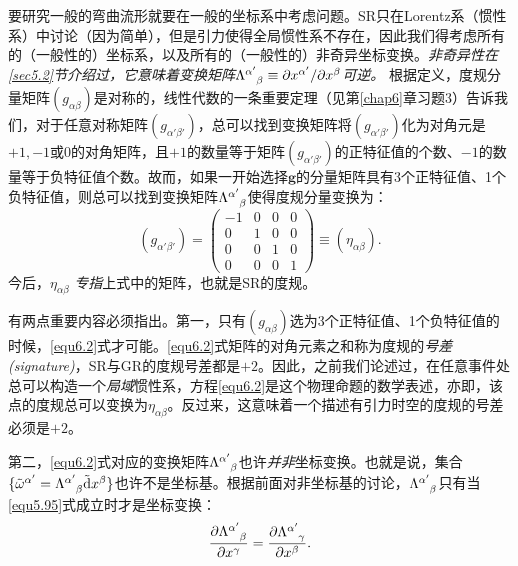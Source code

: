 要研究一般的弯曲流形就要在一般的坐标系中考虑问题。SR只在Lorentz系（惯性系）中讨论（因为简单），但是引力使得全局惯性系不存在，因此我们得考虑所有的（一般性的）坐标系，以及所有的（一般性的）非奇异坐标变换。\textit{非奇异性在\ref{sec5.2}节介绍过，它意味着变换矩阵$\Lambda\indices{^{\alpha'}_\beta} \equiv \partial x^{\alpha'} / \partial x^\beta$可逆。} 根据定义，度规分量矩阵$(g_{\alpha \beta})$是对称的，线性代数的一条重要定理（见第\ref{chap6}章习题3）告诉我们，对于任意对称矩阵$(g_{\alpha' \beta'})$，总可以找到变换矩阵将$(g_{\alpha' \beta'})$化为对角元是$+1, -1$或0的对角矩阵，且$+1$的数量等于矩阵$(g_{\alpha' \beta'})$的正特征值的个数、$-1$的数量等于负特征值个数。故而，如果一开始选择$\bm{g}$的分量矩阵具有3个正特征值、1个负特征值，则总可以找到变换矩阵$\Lambda\indices{^{\alpha'}_\beta}$使得度规分量变换为：
\begin{equation}
    (g_{\alpha' \beta'}) = 
    \begin{pmatrix}
        -1 & 0 & 0 & 0 \\
        0 & 1 & 0 & 0 \\
        0 & 0 & 1 & 0 \\
        0 & 0 & 0 & 1
    \end{pmatrix}
    \equiv (\eta_{\alpha \beta}).
\label{equ6.2}
\end{equation}
今后，$\eta_{\alpha \beta}$ \textit{专指}上式中的矩阵，也就是SR的度规。

有两点重要内容必须指出。第一，只有$(g_{\alpha \beta})$选为3个正特征值、1个负特征值的时候，\eqref{equ6.2}式才可能。\eqref{equ6.2}式矩阵的对角元素之和称为度规的\textit{号差 (signature)}，SR与GR的度规号差都是$+2$。因此，之前我们论述过，在任意事件处总可以构造一个\textit{局域}惯性系，方程\eqref{equ6.2}是这个物理命题的数学表述，亦即，该点的度规总可以变换为$\eta_{\alpha \beta}$。反过来，这意味着一个描述有引力时空的度规的号差必须是$+2$。

第二，\eqref{equ6.2}式对应的变换矩阵$\Lambda\indices{^{\alpha'}_\beta}$也许\textit{并非}坐标变换。也就是说，集合$\{ \tilde{\omega}^{\alpha'} = \Lambda\indices{^{\alpha'}_\beta} \trd x^\beta \}$也许不是坐标基。根据前面对非坐标基的讨论，$\Lambda\indices{^{\alpha'}_\beta}$只有当\eqref{equ5.95}式成立时才是坐标变换：
\[
    \frac{\partial \Lambda\indices{^{\alpha'}_\beta}}{\partial x^\gamma} = \frac{\partial \Lambda\indices{^{\alpha'}_\gamma}}{\partial x^\beta}.
\]

